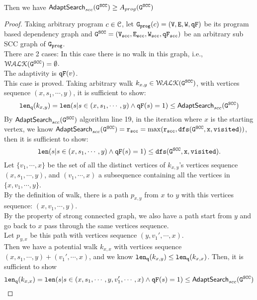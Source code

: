 \\
Then we have
$\mathsf{AdaptSearch}_{scc}(\mathtt{G^{SCC}}) \geq A_{{prog}}(\mathtt{G^{SCC}})$
\\
\begin{proof}
  Taking arbitrary program $c \in \mathcal{C}$, let $\mathtt{{G_{prog}}}(c) = (\mathtt{V}, \mathtt{E}, \mathtt{W}, \mathtt{qF})$ be its 
  program based dependency graph and $\mathtt{G^{SCC}} = (\mathtt{{V_{scc}}}, \mathtt{{E_{scc}}}, \mathtt{{W_{scc}}}, \mathtt{{qF_{scc}}})$ be an arbitrary sub SCC graph of $\mathtt{{G_{prog}}}$.
  \\
There are 2 cases:
%
In this case there is no walk in this graph, i.e., $\mathcal{WALK}(\mathtt{G^{SCC}}) = \emptyset$.
\\
The adaptivity is $\mathtt{qF}(v)$.
\\
This case is proved.
%
  Taking arbitrary walk $k_{x,y} \in \mathcal{WALK}{(\mathtt{G^{SCC}}})$, with vertices sequence
  $(x, s_1, \cdots, y)$, it is sufficient to show:
  \[
    \mathtt{len}_{\tt q}(k_{x,y}) = \mathtt{len}(s | s \in (x, s_1, \cdots, y) \land \mathtt{qF}(s) = 1) \leq \mathsf{AdaptSearch}_{scc}(\mathtt{G^{SCC}})
  \]
  By $\mathsf{AdaptSearch}_{scc}(\mathtt{G^{SCC}})$ algorithm line 19, in the iteration where $x$ is the starting vertex,
  we know $\mathsf{AdaptSearch}_{scc}(\mathtt{G^{SCC}}) = \mathtt{r_{scc}} = \max(\mathtt{r_{scc}, \mathtt{dfs(\mathtt{G^{SCC}}, x, visited)}})$,
  then it is sufficient to show:
  $$
  \mathtt{len}(s | s \in (x, s_1, \cdots, y) \land \mathtt{qF}(s) = 1) \leq \mathtt{dfs(\mathtt{G^{SCC}}, x, visited)}.
  $$
  Let  $\{v_1, \cdots, x\}$ be the set of all the distinct vertices of $k_{x,y}$'s vertices sequence $(x, s_1, \cdots, y)$, and 
  $(v_1, \cdots, x)$ a subsequence containing all the vertices in $\{x, v_1, \cdots, y\}$.
  \\
  By the definition of walk,
 there  is a path $p_{x,y} $ from $x$ to $y$ with this vertices sequence: $(x, v_1, \cdots, y)$.
  \\
  By the property of strong connected graph, we also have a path start from $y$ and go back to $x$ pass through the same vertices sequence.
  \\
  Let $p_{y, x}$ be this path with vertices sequence $(y, v_1', \cdots, x)$.
  \\
  Then we have a potential walk $k_{x,x}$ with vertices sequence $(x, s_1, \cdots, y) + (v_1', \cdots, x)$, and
  we know $\mathtt{len}_{\tt q}(k_{x,y}) \leq \mathtt{len}_{\tt q}(k_{x,x})$.
  Then, it is sufficient to show 
  $$
  \mathtt{len}_{\tt q}(k_{x,x}) = \mathtt{len}(s | s \in (x, s_1, \cdots, y, v_1', \cdots, x) \land \mathtt{qF}(s) = 1) \leq \mathsf{AdaptSearch}_{scc}(\mathtt{G^{SCC}})
$$
\end{proof}
